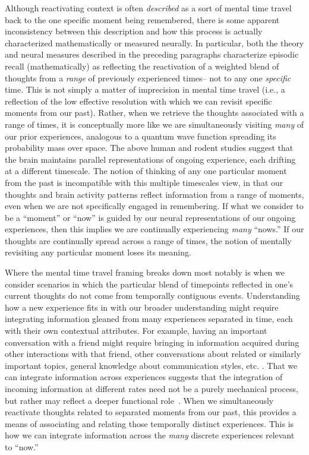 \documentclass{article}
\begin{document}
Although reactivating context is often \textit{described} as a sort of mental time travel back to the one specific moment being remembered, there is some apparent inconsistency between this description and how this process is actually characterized mathematically or measured neurally.  In particular, both the theory and neural measures described in the preceding paragraphs characterize episodic recall (mathematically) as reflecting the reactivation of a weighted blend of thoughts from a \textit{range} of previously experienced times-- not to any one \textit{specific} time.  This is not simply a matter of imprecision in mental time travel (i.e., a reflection of the low effective resolution with which we can revisit specific moments from our past).  Rather, when we retrieve the thoughts associated with a range of times, it is conceptually more like we are simultaneously visiting \textit{many} of our prior experiences, analogous to a quantum wave function spreading its probability mass over space. The above human and rodent studies suggest that the brain maintains parallel representations of ongoing experience, each drifting at a different timescale.  The notion of thinking of any one particular moment from the past is incompatible with this multiple timescales view, in that our thoughts and brain activity patterns reflect information from a range of moments, even when we are not specifically engaged in remembering.  If what we consider to be a ``moment'' or ``now'' is guided by our neural representations of our ongoing experiences, then this implies we are continually experiencing \textit{many} ``nows.''  If our thoughts are continually spread across a range of times, the notion of mentally revisiting any particular moment loses its meaning.

Where the mental time travel framing breaks down most notably is when we consider scenarios in which the particular blend of timepoints reflected in one's current thoughts do not come from temporally contiguous events.  Understanding how a new experience fits in with our broader understanding might require integrating information gleaned from many experiences separated in time, each with their own contextual attributes.  For example, having an important conversation with a friend might require bringing in information acquired during other interactions with that friend, other conversations about related or similarly important topics, general knowledge about communication styles, etc.  \citep[This notion of bringing a range of prior experiences to bear on guiding our ongoing behaviors is also related to a literature on \textit{situtation models}; for review see][]{RangRitc12}.  That we can integrate information across experiences suggests that the integration of incoming information at different rates need not be a purely mechanical process, but rather may reflect a deeper functional role~\citep[also see][]{BrigEtal18}.  When we simultaneously reactivate thoughts related to separated moments from our past, this provides a means of associating and relating those temporally distinct experiences.  This is how we can integrate information across the \textit{many} discrete experiences relevant to ``now.''
\end{document}
